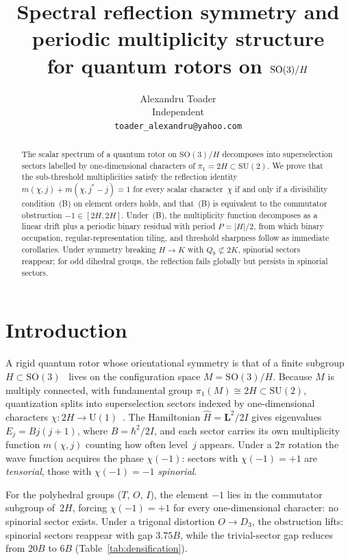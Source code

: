 \documentclass[12pt]{article}
\title{Spectral reflection symmetry and periodic multiplicity structure\\
for quantum rotors on $\SO(3)/H$}
\author{Alexandru Toader\\
Independent\\
\texttt{toader\_alexandru@yahoo.com}}
\date{}
\theoremstyle{definition}
\theoremstyle{remark}
\newcommand{\SU}{\mathrm{SU}}
\newcommand{\SO}{\mathrm{SO}}
\newcommand{\UU}{\mathrm{U}}
\begin{document}
\maketitle

\begin{abstract}
The scalar spectrum of a quantum rotor on $\SO(3)/H$
decomposes into superselection sectors labelled by
one-dimensional characters of $\pi_1 = 2H \subset \SU(2)$.
We prove that the sub-threshold multiplicities satisfy the
reflection identity
$m(\chi,j) + m(\chi, j^*{-}j) = 1$
for every scalar character~$\chi$
if and only if a divisibility condition~(B) on element orders
holds, and that~(B) is equivalent to the commutator
obstruction $-1 \in [2H,2H]$.
Under~(B), the multiplicity function decomposes as a linear
drift plus a periodic binary residual with period $P = |H|/2$,
from which binary occupation, regular-representation tiling,
and threshold sharpness follow as immediate corollaries.
Under symmetry breaking $H \to K$ with $Q_8 \not\subset 2K$,
spinorial sectors reappear; for odd dihedral groups,
the reflection fails globally but persists in
spinorial sectors.
\end{abstract}

\section{Introduction}
\label{sec:intro}

A rigid quantum rotor whose orientational symmetry is that of a
finite subgroup $H \subset \SO(3)$~\cite{BunkerJensen2006,Zhilinskii2001}
lives on the configuration space $M = \SO(3)/H$.
Because $M$ is multiply connected, with fundamental group
$\pi_1(M) \cong 2H \subset \SU(2)$, quantization splits into
superselection sectors indexed by one-dimensional characters
$\chi \colon 2H \to \UU(1)$~\cite{Schulman1968, LaidlawDeWitt1971,
Dowker1972, Isham1984}.
The Hamiltonian $\hat{H} = \mathbf{L}^2/2I$ gives eigenvalues
$E_j = Bj(j{+}1)$, where $B = \hbar^2/2I$, and each sector
carries its own multiplicity function
$m(\chi,j)$ counting how often level~$j$ appears.
Under a $2\pi$ rotation the wave function acquires the phase
$\chi(-1)$: sectors with $\chi(-1) = +1$ are
\emph{tensorial}, those with $\chi(-1) = -1$ \emph{spinorial}.

For the polyhedral groups ($T$, $O$, $I$), the element
$-1$ lies in the commutator subgroup of~$2H$, forcing
$\chi(-1) = +1$ for every one-dimensional character:
no spinorial sector exists.
Under a trigonal distortion $O \to D_3$, the obstruction lifts:
spinorial sectors reappear with gap $3.75B$, while the
trivial-sector gap reduces from $20B$ to $6B$
(Table~\ref{tab:densification}).
\end{document}
